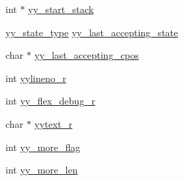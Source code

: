 \begin{DoxyCompactItemize}
\item 
int $\ast$ \hyperlink{structyyguts__t_af6e2e45a5fdba0f313c680b35da4292a}{yy\-\_\-start\-\_\-stack}
\item 
\hyperlink{scanner_8c_a9ba7c416f135b0f0c1f4addded4616b5}{yy\-\_\-state\-\_\-type} \hyperlink{structyyguts__t_a84e01a3658729e9d69f79feb3faf1c99}{yy\-\_\-last\-\_\-accepting\-\_\-state}
\item 
char $\ast$ \hyperlink{structyyguts__t_a46fb8d232ed375921af0b37caeeb67c4}{yy\-\_\-last\-\_\-accepting\-\_\-cpos}
\item 
int \hyperlink{structyyguts__t_aa9f13776b8d311e847cc7d974d49af4c}{yylineno\-\_\-r}
\item 
int \hyperlink{structyyguts__t_a5ad72d75ed6d693824fe7e02ce21118e}{yy\-\_\-flex\-\_\-debug\-\_\-r}
\item 
char $\ast$ \hyperlink{structyyguts__t_aebaa731ad6cbe2411d104925e5bb3f2c}{yytext\-\_\-r}
\item 
int \hyperlink{structyyguts__t_a664a72171cc3e720fcb8120af9b72883}{yy\-\_\-more\-\_\-flag}
\item 
int \hyperlink{structyyguts__t_a683563bf4cd73f25b4c7b78579c1330e}{yy\-\_\-more\-\_\-len}
\end{DoxyCompactItemize}


